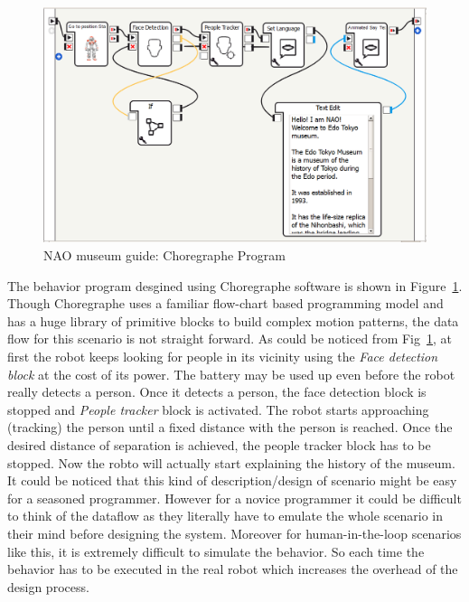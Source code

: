 \begin{figure}[H]
\centering
\includegraphics[width=\textwidth]{../thesis/assets/scenario_museum_choregraphe2.png}
\caption[NAO museum guide: Choregraphe Program]{NAO museum guide: Choregraphe Program}
\label{fig:scenario1_program_choregraphe}
\end{figure}

The behavior program desgined using Choregraphe software is shown in Figure~\ref{fig:scenario1_program_choregraphe}. Though Choregraphe uses a familiar flow-chart based programming model and has a huge library of primitive blocks to build complex motion patterns, the data flow for this scenario is not straight forward. As could be noticed from Fig~\ref{fig:scenario1_program_choregraphe}, at first the robot keeps looking for people in its vicinity using the \emph{Face detection block} at the cost of its power. The battery may be used up even before the robot really detects a person. Once it detects a person, the face detection block is stopped and \emph{People tracker} block is activated. The robot starts approaching (tracking) the person until a fixed distance with the person is reached. Once the desired distance of separation is achieved, the people tracker block has to be stopped. Now the robto will actually start explaining the history of the museum. It could be noticed that this kind of description/design of scenario might be easy for a seasoned programmer. However for a novice programmer it could be difficult to think of the dataflow as they literally have to emulate the whole scenario in their mind before designing the system. Moreover for human-in-the-loop scenarios like this, it is extremely difficult to simulate the behavior. So each time the behavior has to be executed in the real robot which increases the overhead of the design process.

